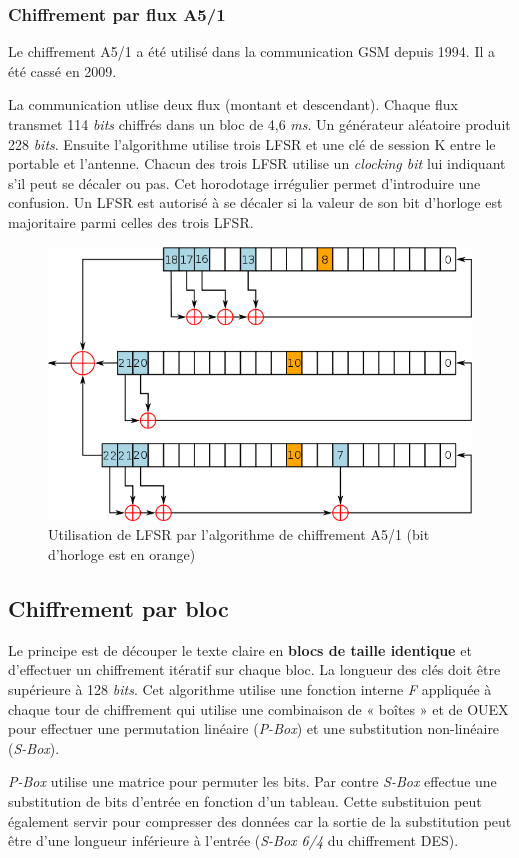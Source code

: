 \documentclass[12pt, a4paper]{article}
\begin{document}
	\subsubsection{Chiffrement par flux A5/1}
	Le chiffrement A5/1 a été utilisé dans la communication GSM depuis 1994. Il a
	été cassé en 2009.
	\par
	La communication utlise deux flux (montant et descendant). Chaque flux
	transmet 114 \textit{bits} chiffrés dans un bloc de 4,6 \textit{ms}. Un
	générateur aléatoire produit 228 \textit{bits}. Ensuite l'algorithme utilise
	trois LFSR et une clé de session K entre le portable et l'antenne. Chacun des
	trois LFSR utilise un \textit{clocking bit} lui indiquant s'il peut se décaler
	 ou pas. Cet horodotage irrégulier permet d'introduire une confusion. Un LFSR
	est autorisé à se décaler si la valeur de son bit d'horloge est majoritaire
	parmi celles des trois LFSR.
	\begin{figure}[!ht]
		\centering
		\includegraphics[width=1\textwidth]{images/Lfsra51}
		\caption{Utilisation de LFSR par l'algorithme de chiffrement A5/1 (bit
		d'horloge est en orange)}
		\label{fig:lfsra51}
	\end{figure}
	\subsection{Chiffrement par bloc}
	Le principe est de découper le texte claire en \textbf{blocs de taille
	identique} et d'effectuer un chiffrement itératif sur chaque bloc. La
	longueur des clés doit être supérieure à 128 \textit{bits}. Cet algorithme
	utilise une fonction interne \textit{F} appliquée à chaque tour de chiffrement
	 qui utilise une combinaison de « boîtes » et de OUEX pour effectuer une
	permutation linéaire (\textit{P-Box}) et une substitution non-linéaire
	(\textit{S-Box}).
	\par
	\textit{P-Box} utilise une matrice pour permuter les bits. Par contre
	\textit{S-Box} effectue une substitution de bits d'entrée en fonction d'un
	tableau. Cette substituion peut également servir pour compresser des données
	car la sortie de la substitution peut être d'une longueur inférieure à
	l'entrée (\textit{S-Box 6/4} du chiffrement DES).
\end{document}
